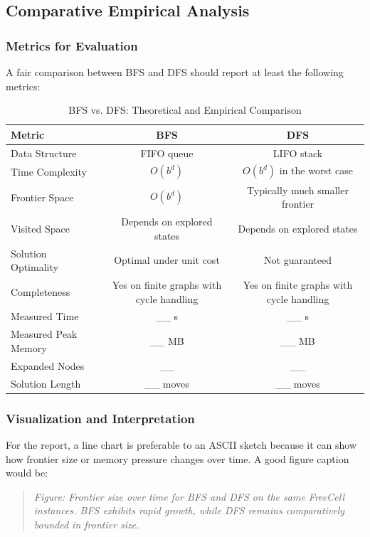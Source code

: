 \documentclass{article}
\begin{document}
\subsection{Comparative Empirical Analysis}

\subsubsection{Metrics for Evaluation}

A fair comparison between BFS and DFS should report at least the following metrics:

\begin{table}[h]
\centering
\caption{BFS vs. DFS: Theoretical and Empirical Comparison}
\begin{tabular}{lcc}
\toprule
\textbf{Metric} & \textbf{BFS} & \textbf{DFS} \\
\midrule
Data Structure & FIFO queue & LIFO stack \\
Time Complexity & $O(b^d)$ & $O(b^d)$ in the worst case \\
Frontier Space & $O(b^d)$ & Typically much smaller frontier \\
Visited Space & Depends on explored states & Depends on explored states \\
Solution Optimality & Optimal under unit cost & Not guaranteed \\
Completeness & Yes on finite graphs with cycle handling & Yes on finite graphs with cycle handling \\
Measured Time & __ s & __ s \\
Measured Peak Memory & __ MB & __ MB \\
Expanded Nodes & __ & __ \\
Solution Length & __ moves & __ moves \\
\bottomrule
\end{tabular}
\end{table}

\subsubsection{Visualization and Interpretation}

For the report, a line chart is preferable to an ASCII sketch because it can show how frontier size or memory pressure changes over time. A good figure caption would be:

\begin{quote}
\textit{Figure: Frontier size over time for BFS and DFS on the same FreeCell instances. BFS exhibits rapid growth, while DFS remains comparatively bounded in frontier size.}
\end{quote}
\end{document}
